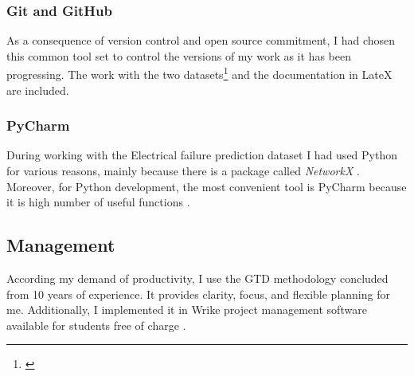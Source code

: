 			\subsubsection{Git and GitHub}
As a consequence of version control and open source commitment, I had chosen this common tool set \cite{Github} to control the versions of my work as it has been progressing. The work with the two datasets\footnote{\cite{GitHub_CAN_RUL,GitHub_FP_RUL}} and the documentation in LateX \cite{GitHub_Thesis_Text} are included.
			\subsubsection{PyCharm}
During working with the Electrical failure prediction dataset I had used Python for various reasons, mainly because there is a package called \textit{NetworkX} \cite{NetworkX}. Moreover, for Python development, the most convenient tool is PyCharm because it is high number of useful functions \cite{PyCharm}.	
		\subsection{Management}
According my demand of productivity, I use the GTD \cite{GTD} methodology concluded from 10 years of experience. It provides clarity, focus, and flexible planning for me. Additionally, I implemented it in Wrike \cite{WRIKE} project management software available for students free of charge \cite{WRIKE_for_students}.